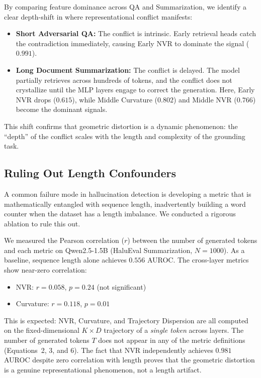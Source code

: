 \documentclass[10pt]{article}
\begin{document}
By comparing feature dominance across QA and Summarization, we identify a clear depth-shift in where representational conflict manifests:
\begin{itemize}[nosep,leftmargin=*]
    \item \textbf{Short Adversarial QA:} The conflict is intrinsic. Early retrieval heads catch the contradiction immediately, causing Early NVR to dominate the signal ($0.991$).
    \item \textbf{Long Document Summarization:} The conflict is delayed. The model partially retrieves across hundreds of tokens, and the conflict does not crystallize until the MLP layers engage to correct the generation. Here, Early NVR drops ($0.615$), while Middle Curvature ($0.802$) and Middle NVR ($0.766$) become the dominant signals.
\end{itemize}
This shift confirms that geometric distortion is a dynamic phenomenon: the ``depth'' of the conflict scales with the length and complexity of the grounding task.\n\n\subsection{Ruling Out Length Confounders}
\label{sec:length}

A common failure mode in hallucination detection is developing a metric that is mathematically entangled with sequence length, inadvertently building a word counter when the dataset has a length imbalance.
We conducted a rigorous ablation to rule this out.

We measured the Pearson correlation ($r$) between the number of generated tokens and each metric on Qwen2.5-1.5B (HaluEval Summarization, $N = 1000$).
As a baseline, sequence length alone achieves $0.556$ AUROC.
The cross-layer metrics show near-zero correlation:
\begin{itemize}[nosep,leftmargin=*]
    \item NVR: $r = 0.058$, $p = 0.24$ (not significant)
    \item Curvature: $r = 0.118$, $p = 0.01$
\end{itemize}

This is expected: NVR, Curvature, and Trajectory Dispersion are all computed on the fixed-dimensional $K \times D$ trajectory of a \emph{single token} across layers.
The number of generated tokens $T$ does not appear in any of the metric definitions (Equations~2, 3, and 6).
The fact that NVR independently achieves $0.981$ AUROC despite zero correlation with length proves that the geometric distortion is a genuine representational phenomenon, not a length artifact.
\end{document}

